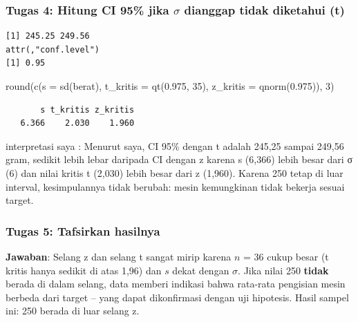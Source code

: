 \documentclass[
  indonesian,
  letterpaper,
]{book}
\newenvironment{Shaded}{\begin{snugshade}}{\end{snugshade}}
\newcommand{\AttributeTok}[1]{\textcolor[rgb]{0.40,0.45,0.13}{#1}}
\newcommand{\DecValTok}[1]{\textcolor[rgb]{0.68,0.00,0.00}{#1}}
\newcommand{\FloatTok}[1]{\textcolor[rgb]{0.68,0.00,0.00}{#1}}
\newcommand{\FunctionTok}[1]{\textcolor[rgb]{0.28,0.35,0.67}{#1}}
\newcommand{\NormalTok}[1]{\textcolor[rgb]{0.00,0.23,0.31}{#1}}
\newcommand{\SpecialCharTok}[1]{\textcolor[rgb]{0.37,0.37,0.37}{#1}}
\begin{document}
\subsubsection{\texorpdfstring{Tugas 4: Hitung CI 95\% jika \(\sigma\)
dianggap tidak diketahui
(t)}{Tugas 4: Hitung CI 95\% jika \textbackslash sigma dianggap tidak diketahui (t)}}\label{tugas-4-hitung-ci-95-jika-sigma-dianggap-tidak-diketahui-t}

\begin{Shaded}
\end{Shaded}

\begin{verbatim}
[1] 245.25 249.56
attr(,"conf.level")
[1] 0.95
\end{verbatim}

\begin{Shaded}
\begin{Highlighting}[]
\FunctionTok{round}\NormalTok{(}\FunctionTok{c}\NormalTok{(}\AttributeTok{s =} \FunctionTok{sd}\NormalTok{(berat), }\AttributeTok{t\_kritis =} \FunctionTok{qt}\NormalTok{(}\FloatTok{0.975}\NormalTok{, }\DecValTok{35}\NormalTok{), }\AttributeTok{z\_kritis =} \FunctionTok{qnorm}\NormalTok{(}\FloatTok{0.975}\NormalTok{)), }\DecValTok{3}\NormalTok{)}
\end{Highlighting}
\end{Shaded}

\begin{verbatim}
       s t_kritis z_kritis 
   6.366    2.030    1.960 
\end{verbatim}

interpretasi saya : Menurut saya, CI 95\% dengan t adalah 245,25 sampai
249,56 gram, sedikit lebih lebar daripada CI dengan z karena s (6,366)
lebih besar dari σ (6) dan nilai kritis t (2,030) lebih besar dari z
(1,960). Karena 250 tetap di luar interval, kesimpulannya tidak berubah:
mesin kemungkinan tidak bekerja sesuai target.

\subsubsection{Tugas 5: Tafsirkan
hasilnya}\label{tugas-5-tafsirkan-hasilnya}

\textbf{Jawaban}: Selang z dan selang t sangat mirip karena \(n\) = 36
cukup besar (t kritis hanya sedikit di atas 1,96) dan \(s\) dekat dengan
\(\sigma\). Jika nilai 250 \textbf{tidak} berada di dalam selang, data
memberi indikasi bahwa rata-rata pengisian mesin berbeda dari target --
yang dapat dikonfirmasi dengan uji hipotesis. Hasil sampel ini: 250
berada di luar selang z.
\end{document}
